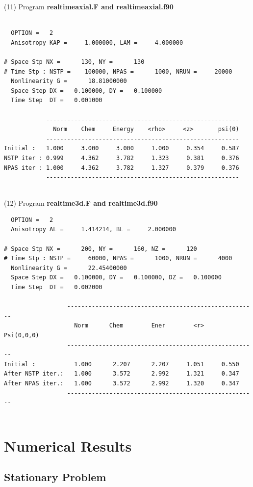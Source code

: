 \documentclass[onecolumn]{elsart3p}
\begin{document}
(11)  Program {\bf realtimeaxial.F and realtimeaxial.f90}
\begin{verbatim}

  OPTION =   2
  Anisotropy KAP =     1.000000, LAM =     4.000000

# Space Stp NX =      130, NY =      130
# Time Stp : NSTP =    100000, NPAS =      1000, NRUN =     20000
  Nonlinearity G =      18.81000000
  Space Step DX =   0.100000, DY =   0.100000
  Time Step  DT =   0.001000

            -------------------------------------------------------
              Norm    Chem     Energy    <rho>     <z>       psi(0)
            -------------------------------------------------------
Initial :   1.000     3.000     3.000     1.000     0.354     0.587
NSTP iter : 0.999     4.362     3.782     1.323     0.381     0.376
NPAS iter : 1.000     4.362     3.782     1.327     0.379     0.376
            -------------------------------------------------------


\end{verbatim}


(12)  Program {\bf realtime3d.F and realtime3d.f90}
\begin{verbatim}
  OPTION =   2
  Anisotropy AL =     1.414214, BL =     2.000000

# Space Stp NX =      200, NY =      160, NZ =      120
# Time Stp : NSTP =     60000, NPAS =      1000, NRUN =      4000
  Nonlinearity G =      22.45400000
  Space Step DX =   0.100000, DY =   0.100000, DZ =   0.100000
  Time Step  DT =   0.002000

                  ------------------------------------------------------
                    Norm      Chem        Ener        <r>     Psi(0,0,0)
                  ------------------------------------------------------
Initial :           1.000      2.207      2.207     1.051     0.550
After NSTP iter.:   1.000      3.572      2.992     1.321     0.347
After NPAS iter.:   1.000      3.572      2.992     1.320     0.347
                  ------------------------------------------------------


\end{verbatim}


\label{5.3}



\section{Numerical Results}
\label{NUM}
\subsection{Stationary Problem}
\end{document}
